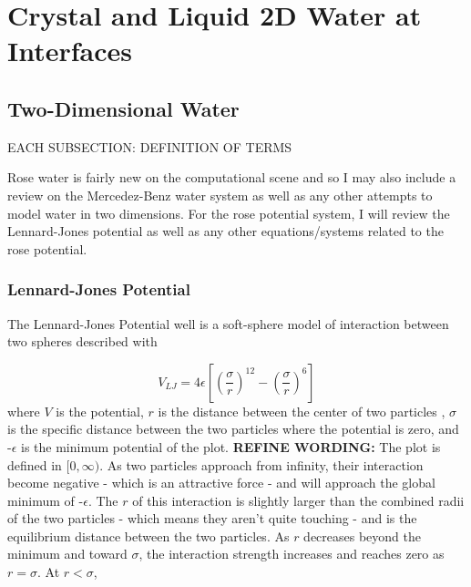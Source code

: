 \chapter{Crystal and Liquid 2D Water at Interfaces}
\label{ch:2DWater}


\section{Two-Dimensional Water}

EACH SUBSECTION: DEFINITION OF TERMS

Rose water is fairly new on the computational scene and so I may also include a review on the Mercedez-Benz water system as well as any other attempts to model water in two dimensions. For the rose potential system, I will review the Lennard-Jones potential  as well as any other equations/systems related to the rose potential.

\subsection{Lennard-Jones Potential}

The Lennard-Jones Potential well is a soft-sphere model of interaction  between two spheres described with

\begin{equation}
V_{LJ} = 4\epsilon[(\frac{\sigma}{r})^{12} - (\frac{\sigma}{r})^{6}]
\end{equation}
where $V$ is the potential, $r$ is the distance between the center of two particles , $\sigma$ is the specific distance between the two particles where the potential is zero, and -$\epsilon$ is the minimum potential of the plot.
\textbf{REFINE WORDING:}
The plot is defined in $[0,\infty)$.
As two particles approach from infinity, their interaction become negative - which is an attractive force - and will approach the global minimum of -$\epsilon$.
The $r$ of this interaction is slightly larger than the combined radii of the two particles - which means they aren't quite touching - and is the equilibrium distance between the two particles.
As $r$ decreases beyond the minimum and toward $\sigma$, the interaction strength increases and reaches zero as $r = \sigma$.
At $r < \sigma$, 


